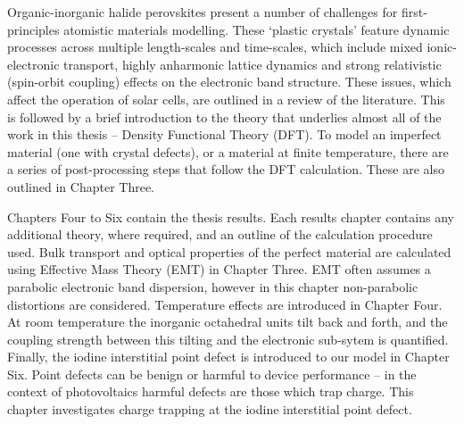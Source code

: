 Organic-inorganic halide perovskites present a number of challenges for first-principles atomistic materials modelling. These `plastic crystals' feature dynamic processes across multiple length-scales and time-scales, which include mixed ionic-electronic transport, highly anharmonic lattice dynamics and strong relativistic (spin-orbit coupling) effects on the electronic band structure.
These issues, which affect the operation of solar cells, are outlined in a review of the literature. 
This is followed by a brief introduction to the theory that underlies almost all of the work in this thesis -- Density Functional Theory (DFT). 
To model an imperfect material (one with crystal defects), or a material at finite temperature, there are a series of post-processing steps that follow the DFT calculation. These are also outlined in Chapter Three.

Chapters Four to Six contain the thesis results. Each results chapter contains any additional theory, where required, and an outline of the calculation procedure used. Bulk transport and optical properties of the perfect material are calculated using Effective Mass Theory (EMT) in Chapter Three. 
EMT often assumes a parabolic electronic band dispersion, however in this chapter non-parabolic distortions are considered.
Temperature effects are introduced in Chapter Four. 
At room temperature the inorganic octahedral  units tilt back and forth, and the coupling strength between this tilting and the electronic sub-sytem is quantified.
Finally, the iodine interstitial point defect is introduced to our model in Chapter Six. Point defects can be benign or harmful to device performance -- in the context of photovoltaics harmful defects are those which trap charge. This chapter investigates charge trapping at the iodine interstitial point defect.



